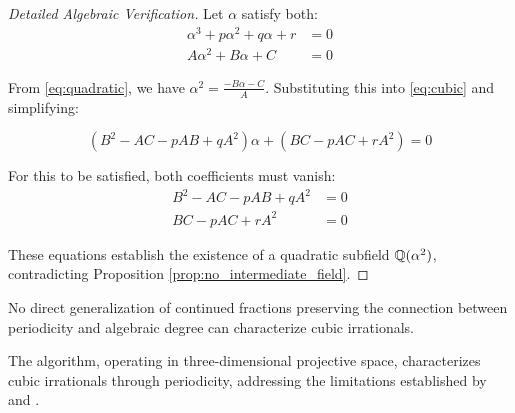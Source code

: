 \begin{proof}[Detailed Algebraic Verification]
Let $\alpha$ satisfy both:
\begin{align}
\alpha^3 + p\alpha^2 + q\alpha + r &= 0 \label{eq:cubic} \\
A\alpha^2 + B\alpha + C &= 0 \label{eq:quadratic}
\end{align}

From \eqref{eq:quadratic}, we have $\alpha^2 = \frac{-B\alpha - C}{A}$. Substituting this into \eqref{eq:cubic} and simplifying:

\begin{equation}
(B^2 - AC - pAB + qA^2)\alpha + (BC - pAC + rA^2) = 0
\end{equation}

For this to be satisfied, both coefficients must vanish:
\begin{align}
B^2 - AC - pAB + qA^2 &= 0 \label{eq:coeff1} \\
BC - pAC + rA^2 &= 0 \label{eq:coeff2}
\end{align}

These equations establish the existence of a quadratic subfield $\mathbb{Q}(\alpha^2)$, contradicting Proposition \ref{prop:no_intermediate_field}.
\end{proof}

\begin{corollary}\label{cor:cf_insufficient}
No direct generalization of continued fractions preserving the connection between periodicity and algebraic degree can characterize cubic irrationals.
\end{corollary}

The \HAPD{} algorithm, operating in three-dimensional projective space, characterizes cubic irrationals through periodicity, addressing the limitations established by \cite{Khinchin1964} and \cite{Cassels1957}.
